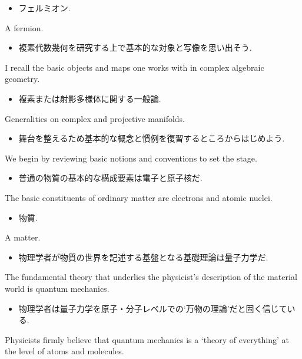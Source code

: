 \documentclass[openany, a4paper, oneside]{jsbook}
\begin{document}
\begin{itemize}
\item フェルミオン. \cite{LiebSeiringer1}
\end{itemize}
A fermion.

\begin{itemize}
\item 複素代数幾何を研究する上で基本的な対象と写像を思い出そう. \cite{ChrisPeters1}
\end{itemize}
I recall the basic objects and maps one works with in complex algebraic geometry.

\begin{itemize}
\item 複素または射影多様体に関する一般論. \cite{ChrisPeters1}
\end{itemize}
Generalities on complex and projective manifolds.

\begin{itemize}
\item 舞台を整えるため基本的な概念と慣例を復習するところからはじめよう. \cite{AltmanKleiman1}
\end{itemize}
We begin by reviewing basic notions and conventions to set the stage.

\begin{itemize}
\item 普通の物質の基本的な構成要素は電子と原子核だ. \cite{LiebSeiringer1}
\end{itemize}
The basic constituents of ordinary matter are electrons and atomic nuclei.

\begin{itemize}
\item 物質.
\end{itemize}
A matter.

\begin{itemize}
\item 物理学者が物質の世界を記述する基盤となる基礎理論は量子力学だ. \cite{LiebSeiringer1}
\end{itemize}
The fundamental theory that underlies the physicist's description of the material world is quantum mechanics.

\begin{itemize}
\item 物理学者は量子力学を原子・分子レベルでの`万物の理論'だと固く信じている. \cite{LiebSeiringer1}
\end{itemize}
Physicists firmly believe that quantum mechanics is a `theory of everything' at the level of atoms and molecules.
\end{document}
